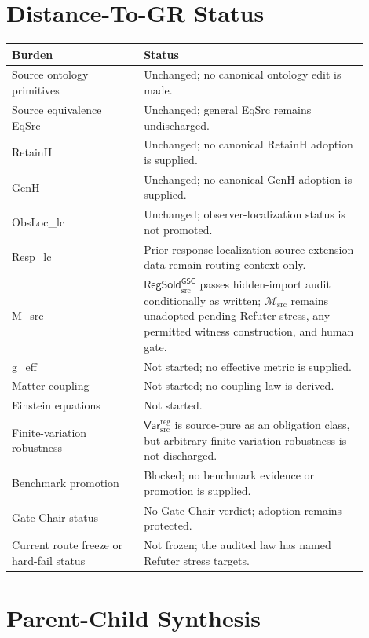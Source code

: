 \documentclass[11pt]{article}
\newcommand{\Msrc}{\mathcal{M}_{\mathrm{src}}}
\newcommand{\RegSold}{\mathsf{RegSold}_{\mathrm{src}}^{\mathsf{GSC}}}
\newcommand{\VarRegSrc}{\mathsf{Var}^{\mathrm{reg}}_{\mathrm{src}}}
\begin{document}
\section{Distance-To-GR Status}

\begin{center}
\begin{tabular}{p{0.33\linewidth}p{0.57\linewidth}}
\hline
Burden & Status \\
\hline
Source ontology primitives & Unchanged; no canonical ontology edit is made. \\
Source equivalence EqSrc & Unchanged; general EqSrc remains undischarged. \\
RetainH & Unchanged; no canonical RetainH adoption is supplied. \\
GenH & Unchanged; no canonical GenH adoption is supplied. \\
ObsLoc\_lc & Unchanged; observer-localization status is not promoted. \\
Resp\_lc & Prior response-localization source-extension data remain routing context only. \\
M\_src & \(\RegSold\) passes hidden-import audit conditionally as written; \(\Msrc\) remains unadopted pending Refuter stress, any permitted witness construction, and human gate. \\
g\_eff & Not started; no effective metric is supplied. \\
Matter coupling & Not started; no coupling law is derived. \\
Einstein equations & Not started. \\
Finite-variation robustness & \(\VarRegSrc\) is source-pure as an obligation class, but arbitrary finite-variation robustness is not discharged. \\
Benchmark promotion & Blocked; no benchmark evidence or promotion is supplied. \\
Gate Chair status & No Gate Chair verdict; adoption remains protected. \\
Current route freeze or hard-fail status & Not frozen; the audited law has named Refuter stress targets. \\
\hline
\end{tabular}
\end{center}

\section{Parent-Child Synthesis}
\end{document}
